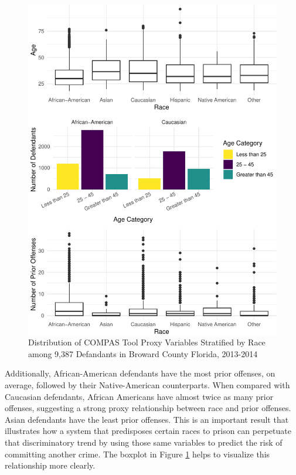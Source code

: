 \documentclass[12pt, twoside]{amherstthesis}
\begin{document}
\begin{figure}

{\centering \includegraphics{Dasha-Asienga_StatThesis_files/figure-latex/ch3fig10-1} 

}

\caption{Distribution of COMPAS Tool Proxy Variables Stratified by Race among 9,387 Defandants in Broward County Florida, 2013-2014}\label{fig:ch3fig10}
\end{figure}
Additionally, African-American defendants have the most prior offenses, on average, followed by their Native-American counterparts. When compared with Caucasian defendants, African Americans have almost twice as many prior offenses, suggesting a strong proxy relationship between race and prior offenses. Asian defendants have the least prior offenses. This is an important result that illustrates how a system that predisposes certain races to prison can perpetuate that discriminatory trend by using those same variables to predict the risk of committing another crime. The boxplot in Figure \ref{fig:ch3fig10} helps to visualize this relationship more clearly.
\end{document}
